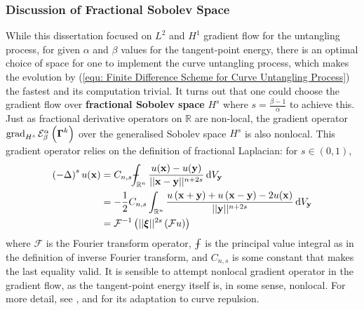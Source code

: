 \documentclass[../dissertation.tex]{subfiles}
\begin{document}
\subsubsection{Discussion of Fractional Sobolev Space}
\label{sct: Discussion of Fractional Sobolev Space}
While this dissertation focused on $L^2$ and $H^1$ gradient flow for the untangling process,
for given $\alpha$ and $\beta$ values for the tangent-point energy,
there is an optimal choice of space for one to implement the curve untangling process,
which makes the evolution by (\ref{equ: Finite Difference Scheme for Curve Untangling Process}) the fastest
and its computation trivial.
It turns out that one could choose the gradient flow over \textbf{fractional Sobolev space} $H^s$
where $s = \frac{\beta - 1}{\alpha}$ to achieve this\cite{YSC2021}.
Just as fractional derivative operators on $\mathbb{R}$ are non-local,
the gradient operator $\operatorname{grad}_{H^s} \mathcal{E}_{\beta}^{\alpha} \left( \boldsymbol{\Gamma}^k \right)$ over
the generalised Sobolev space $H^s$ is also nonlocal.
This gradient operator relies on the definition of fractional Laplacian\cite{DINEZZA2012521}:
for $s \in \left( 0,1 \right)$,
\begin{align}
    \left( -\laplacian \right)^s u(\xbf) &= C_{n,s} \dashint_{\mathbb{R}^n} \frac{u(\xbf) - u(\ybf)}{\norm{\xbf - \ybf}^{n+2s}} \intd V_{\ybf} \\
    &= -\frac{1}{2} C_{n,s} \int_{\mathbb{R}^n} \frac{u\left( \xbf + \ybf \right) + u\left( \xbf - \ybf \right) - 2 u(\xbf)}{\norm{\ybf}^{n+2s}} \intd V_{\ybf} \\
    &= \mathcal{F}^{-1} \left( \norm{\xibf}^{2s} \left( \mathcal{F} u \right) \right)
\end{align}
where $\mathcal{F}$ is the Fourier transform operator, $\dashint$ is the principal value integral as in the definition of inverse Fourier transform, and $C_{n,s}$ is some constant that makes the last equality valid.
It is sensible to attempt nonlocal gradient operator in the gradient flow, as the tangent-point energy itself is, in some sense, nonlocal.
For more detail, see \cite{DINEZZA2012521}, and \cite{YSC2021} for its adaptation to curve repulsion.
\end{document}
